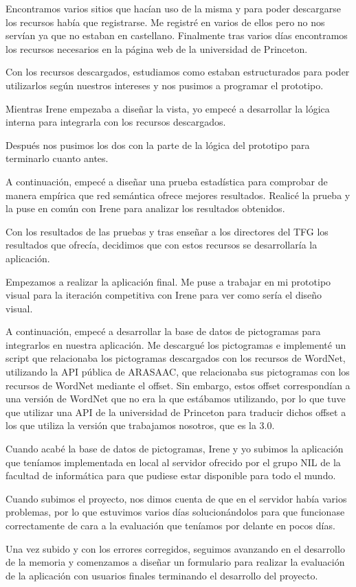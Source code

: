 Encontramos varios sitios que hacían uso de la misma y para poder descargarse los recursos había que registrarse. Me registré en varios de ellos pero no nos servían ya que no estaban en castellano. Finalmente tras varios días encontramos los recursos necesarios en la página web de la universidad de Princeton.

Con los recursos descargados, estudiamos como estaban estructurados para poder utilizarlos según nuestros intereses y nos pusimos a programar el prototipo.

Mientras Irene empezaba a diseñar la vista, yo empecé a desarrollar la lógica interna para integrarla con los recursos descargados.

Después nos pusimos los dos con la parte de la lógica del prototipo para terminarlo cuanto antes.

A continuación, empecé a diseñar una prueba estadística para comprobar de manera empírica que red semántica ofrece mejores resultados. Realicé la prueba y la puse en común con Irene para analizar los resultados obtenidos.

Con los resultados de las pruebas y tras enseñar a los directores del TFG los resultados que ofrecía, decidimos que con estos recursos se desarrollaría la aplicación. 

Empezamos a realizar la aplicación final. Me puse a trabajar en mi prototipo visual para la iteración competitiva con Irene para ver como sería el diseño visual.

A continuación, empecé a desarrollar la base de datos de pictogramas para integrarlos en nuestra aplicación. Me descargué los pictogramas e implementé un script que relacionaba los pictogramas descargados con los recursos de WordNet, utilizando la API pública de ARASAAC, que relacionaba sus pictogramas con los recursos de WordNet mediante el offset. Sin embargo, estos offset correspondían a una versión de WordNet que no era la que estábamos utilizando, por lo que tuve que utilizar una API de la universidad de Princeton para traducir dichos offset a los que utiliza la versión que trabajamos nosotros, que es la 3.0.

Cuando acabé la base de datos de pictogramas, Irene y yo subimos la aplicación que teníamos implementada en local al servidor ofrecido por el grupo NIL de la facultad de informática para que pudiese estar disponible para todo el mundo. 

Cuando subimos el proyecto, nos dimos cuenta de que en el servidor había varios problemas, por lo que estuvimos varios días solucionándolos para que funcionase correctamente de cara a la evaluación que teníamos por delante en pocos días.


Una vez subido y con los errores corregidos, seguimos avanzando en el desarrollo de la memoria y comenzamos a diseñar un formulario para realizar la evaluación de la aplicación con usuarios finales terminando el desarrollo del proyecto.


